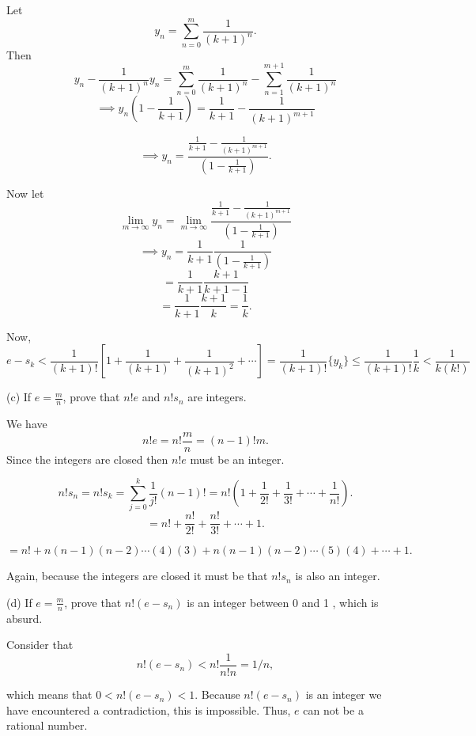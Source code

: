\documentclass{report}
\begin{document}
\begin{myproof}
  Let $$ y_n = \sum_{n=0}^{m} \frac{1}{(k+1)^n} .$$ Then $$y_n - \frac{1}{(k+1)^n} y_n = \sum_{n=0}^{m} \frac{1}{(k+1)^n} - \sum_{n=1}^{m+1} \frac{1}{(k+1)^n} $$ 
  $$\implies y_n\left(1 - \frac{1}{k+1}\right) = \frac{1}{k+1} - \frac{1}{(k+1)^{m+1}} $$   

$$\implies y_n = \frac{\frac{1}{k+1} - \frac{1}{(k+1)^{m+1}}}{\left(1 - \frac{1}{k+1}\right)}.$$


Now let $$ \lim_{m \rightarrow \infty} y_n = \lim_{m \rightarrow \infty}\frac{\frac{1}{k+1} - \frac{1}{(k+1)^{m+1}}}{\left(1 - \frac{1}{k+1}\right)}$$
$$ \implies y_n = \frac{1}{k+1}\frac{1}{\left(1 - \frac{1}{k+1}\right)}$$
$$  = \frac{1}{k+1}\frac{k+1}{k+1-1}$$
$$  = \frac{1}{k+1}\frac{k+1}{k} = \frac{1}{k}.$$


Now, $$ e - s_k  < \frac{1}{(k+1)!}\left[1 + \frac{1}{(k+1)}  + \frac{1}{(k+1)^2} + \cdots \right] = \frac{1}{(k+1)!}\{y_k\} \leq \frac{1}{(k+1)!} \frac{1}{k} < \frac{1}{k(k!)}$$
\end{myproof}

\bigskip

(c) If $e=\frac{m}{n}$, prove that $n ! e$ and $n ! s_n$ are integers.

\begin{myproof}

We have $$ n!e = n!\frac{m}{n} = (n-1)!m.$$ Since the integers are closed then $n!e$ must be an integer. 
    
\end{myproof}

\begin{myproof}

$$ n!s_n = n!s_k=\sum_{j=0}^k \frac{1}{j !}(n-1)! = n!\left(1 + \frac{1}{2!} + \frac{1}{3!}+ \cdots +\frac{1}{n!}\right) .$$
$$ = n! + \frac{n!}{2!} + \frac{n!}{3!}+ \cdots + 1 .$$

$$ = n! + n(n-1)(n-2)\cdots(4)(3) + n(n-1)(n-2)\cdots(5)(4)+ \cdots + 1 .$$

Again, because the integers are closed  it must be that $n!s_n$ is also an integer.
\end{myproof}

\bigskip
(d) If $e=\frac{m}{n}$, prove that $n!\left(e-s_n\right)$ is an integer between 0 and 1 , which is absurd.

\bigskip
\begin{myproof}

Consider that $$n!\left(e-s_n\right) < n!\frac{1}{n!n}= 1/n,$$

which means that $0< n!\left(e-s_n\right) <1.$  Because  $n!(e-s_n)$ is an integer we have encountered a contradiction, this is impossible. Thus, $e$ can not be a rational number.
    
\end{myproof}
\bigskip
\pagebreak
{}
\end{document}
